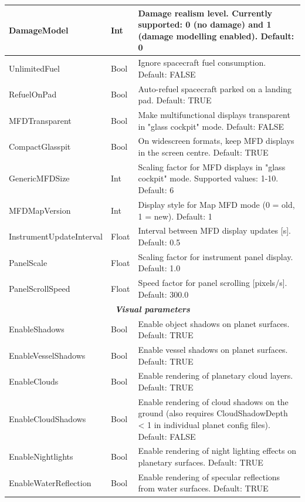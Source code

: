 \documentclass[Orbiter User Manual.tex]{subfiles}
\begin{document}
\begin{longtable}{ |p{}|p{}|p{}| }
	\hline\rule{0pt}{2ex}
	DamageModel & Int & Damage realism level. Currently supported: 0 (no damage) and 1 (damage modelling enabled). Default: 0\\
	\hline\rule{0pt}{2ex}
	UnlimitedFuel & Bool & Ignore spacecraft fuel consumption. Default: FALSE\\
	\hline\rule{0pt}{2ex}
	RefuelOnPad & Bool & Auto-refuel spacecraft parked on a landing pad. Default: TRUE\\
	\hline\rule{0pt}{2ex}
	MFDTransparent & Bool & Make multifunctional displays transparent in "glass cockpit" mode. Default: FALSE\\
	\hline\rule{0pt}{2ex}
	CompactGlasspit & Bool & On widescreen formats, keep MFD displays in the screen centre. Default: TRUE\\
	\hline\rule{0pt}{2ex}
	GenericMFDSize & Int & Scaling factor for MFD displays in "glass cockpit" mode. Supported values: 1-10. Default: 6\\
	\hline\rule{0pt}{2ex}
	MFDMapVersion & Int & Display style for Map MFD mode (0 = old, 1 = new). Default: 1\\
	\hline\rule{0pt}{2ex}
	InstrumentUpdateInterval & Float & Interval between MFD display updates [s]. Default: 0.5\\
	\hline\rule{0pt}{2ex}
	PanelScale & Float & Scaling factor for instrument panel display. Default: 1.0\\
	\hline\rule{0pt}{2ex}
	PanelScrollSpeed & Float & Speed factor for panel scrolling [pixels/s]. Default: 300.0\\
	\hline
	\multicolumn{3}{|c|}{\rule{0pt}{2ex}\textbf{\textit{Visual parameters}}}\\
	\hline\rule{0pt}{2ex}
	EnableShadows & Bool & Enable object shadows on planet surfaces. Default: TRUE\\
	\hline\rule{0pt}{2ex}
	EnableVesselShadows & Bool & Enable vessel shadows on planet surfaces. Default: TRUE\\
	\hline\rule{0pt}{2ex}
	EnableClouds & Bool & Enable rendering of planetary cloud layers. Default: TRUE\\
	\hline\rule{0pt}{2ex}
	EnableCloudShadows & Bool & Enable rendering of cloud shadows on the ground (also requires CloudShadowDepth < 1 in individual planet config files). Default: FALSE\\
	\hline\rule{0pt}{2ex}
	EnableNightlights & Bool & Enable rendering of night lighting effects on planetary surfaces. Default: TRUE\\
	\hline\rule{0pt}{2ex}
	EnableWaterReflection & Bool & Enable rendering of specular reflections from water surfaces. Default: TRUE\\

\end{longtable}
\end{document}
